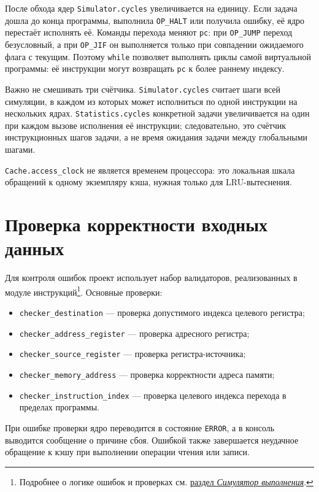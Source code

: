 \documentclass[12pt,a4paper]{article}
\begin{document}
После обхода ядер \texttt{Simulator.cycles} увеличивается на единицу. Если задача дошла до конца программы, выполнила \texttt{OP\_HALT} или получила ошибку, её ядро перестаёт исполнять её. Команды перехода меняют \texttt{pc}: при \texttt{OP\_JUMP} переход безусловный, а при \texttt{OP\_JIF} он выполняется только при совпадении ожидаемого флага с текущим. Поэтому \texttt{while} позволяет выполнять циклы самой виртуальной программы: её инструкции могут возвращать \texttt{pc} к более раннему индексу.

Важно не смешивать три счётчика. \texttt{Simulator.cycles} считает шаги всей симуляции, в каждом из которых может исполниться по одной инструкции на нескольких ядрах. \texttt{Statistics.cycles} конкретной задачи увеличивается на один при каждом вызове исполнения её инструкции; следовательно, это счётчик инструкционных шагов задачи, а не время ожидания задачи между глобальными шагами.

\texttt{Cache.access\_clock} не является временем процессора: это локальная шкала обращений к одному экземпляру кэша, нужная только для LRU-вытеснения.

\section{Проверка корректности входных данных}\label{sec:validation}

Для контроля ошибок проект использует набор валидаторов, реализованных в модуле инструкций\footnote{Подробнее о логике ошибок и проверках см. \hyperref[sec:simulator]{раздел \textit{Симулятор выполнения}}.}. Основные проверки:

\begin{itemize}[leftmargin=1.5em]
    \item \texttt{checker\_destination} --- проверка допустимого индекса целевого регистра;
    \item \texttt{checker\_address\_register} --- проверка адресного регистра;
    \item \texttt{checker\_source\_register} --- проверка регистра-источника;
    \item \texttt{checker\_memory\_address} --- проверка корректности адреса памяти;
    \item \texttt{checker\_instruction\_index} --- проверка целевого индекса перехода в пределах программы.
\end{itemize}

При ошибке проверки ядро переводится в состояние \texttt{ERROR}, а в консоль выводится сообщение о причине сбоя. Ошибкой также завершается неудачное обращение к кэшу при выполнении операции чтения или записи.
\end{document}
